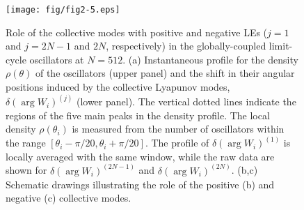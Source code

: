 \documentclass[12pt]{iopart}
\begin{document}
\begin{figure}[t]
  \texttt{[image: fig/fig2-5.eps]}
  \caption{Role of the collective modes with positive and negative LEs ($j=1$ and $j = 2N-1$ and $2N$, respectively) in the globally-coupled limit-cycle oscillators  at $N=512$. (a) Instantaneous profile for the density $\rho(\theta)$ of the oscillators (upper panel) and the shift in their angular positions induced by the collective Lyapunov modes, $\delta(\arg W_i)^{(j)}$ (lower panel). The vertical dotted lines indicate the regions of the five main peaks in the density profile. The local density $\rho(\theta_i)$ is measured from the number of oscillators within the range $[\theta_i - \pi/20, \theta_i+\pi/20]$. The profile of $\delta(\arg W_i)^{(1)}$ is locally averaged with the same window, while the raw data are shown for $\delta(\arg W_i)^{(2N-1)}$ and $\delta(\arg W_i)^{(2N)}$. (b,c) Schematic drawings illustrating the role of the positive (b) and negative (c) collective modes.}
  \label{fig:2-5}
\end{figure}%
\end{document}
